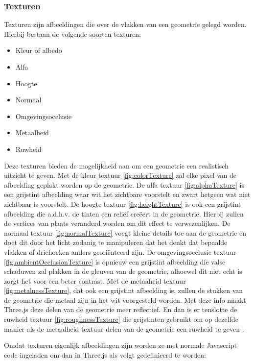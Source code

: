 \newpage
\subsubsection{Texturen}

Texturen zijn afbeeldingen die over de vlakken van een geometrie gelegd worden. Hierbij bestaan de volgende soorten texturen: 

\begin{itemize}
\item Kleur of albedo
\item Alfa
\item Hoogte
\item Normaal
\item Omgevingsocclusie
\item Metaalheid
\item Ruwheid
\end{itemize}

Deze texturen bieden de mogelijkheid aan om een geometrie een realistisch uitzicht te geven. Met de kleur textuur \ref{fig:colorTexture} zal elke pixel van de afbeelding geplakt worden op de geometrie. De alfa textuur \ref{fig:alphaTexture} is een grijstint afbeelding waar wit het zichtbare voorstelt en zwart hetgeen wat niet zichtbaar is voorstelt. De hoogte textuur \ref{fig:heightTexture} is ook een grijstint afbeelding die a.d.h.v. de tinten een reliëf creëert in de geometrie. Hierbij zullen de vertices van plaats veranderd worden om dit effect te verwezenlijken. De normaal textuur \ref{fig:normalTexture} voegt kleine details toe aan de geometrie en doet dit door het licht zodanig te manipuleren dat het denkt dat bepaalde vlakken of driehoeken anders georiënteerd zijn. De omgevingsocclusie textuur \ref{fig:ambientOcclusionTexture} is opnieuw een grijstint afbeelding die valse schaduwen zal plakken in de gleuven van de geometrie, alhoewel dit niet echt is zorgt het voor een beter contrast. Met de metaaheid textuur \ref{fig:metalnessTexture}, dat ook een grijstint afbeelding is, zullen de stukken van de geometrie die metaal zijn in het wit voorgesteld worden. Met deze info maakt Three.js deze delen van de geometrie meer reflectief. En dan is er tenslotte de ruwheid textuur \ref{fig:roughnessTexture} die grijstinten gebruikt om op dezelfde manier als de metaalheid textuur delen van de geometrie een ruwheid te geven \autocite{Simon2023}.

Omdat texturen eigenlijk afbeeldingen zijn worden ze met normale Javascript code ingeladen om dan in Three.js als volgt gedefinieerd te worden:


